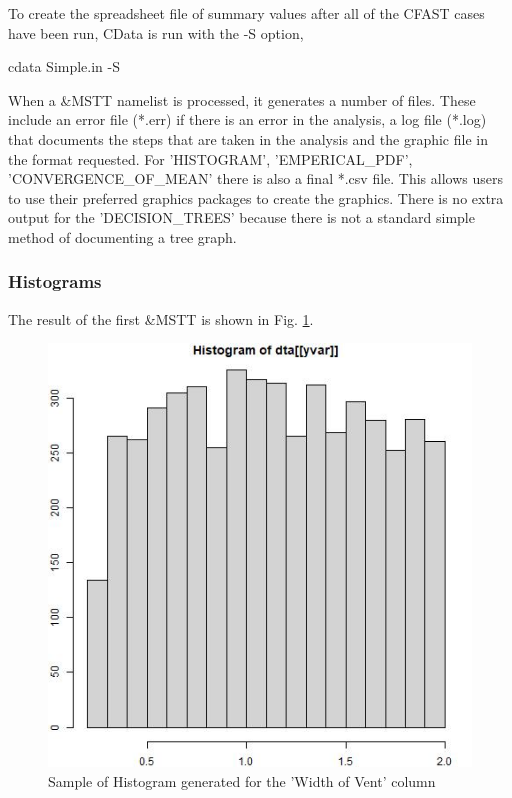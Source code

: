 \documentclass[12pt,twoside]{book}
\begin{document}
To create the spreadsheet file of summary values after all of the CFAST cases have been run, CData is run with the {\ct -S} option,

\vspace{\baselineskip}
{\ct cdata Simple.in -S}
\vspace{\baselineskip}

When a {\ct \&MSTT} namelist is processed, it generates a number of files. These include an error file (*.err) if there is an error in the analysis, a log file (*.log) that documents the steps that are taken in the analysis and the graphic file in the format requested. For {\ct 'HISTOGRAM'}, {\ct 'EMPERICAL\_PDF'}, {\ct 'CONVERGENCE\_OF\_MEAN'} there is also a final *.csv file. This allows users to use their preferred graphics packages to create the graphics. There is no extra output for the {\ct 'DECISION\_TREES'} because there is not a standard simple method of documenting a tree graph.

\subsubsection{Histograms}

The result of the first {\ct \&MSTT} is shown in Fig. \ref{simple_width_hist}.

\begin{figure}[h!]
\centering
\includegraphics[width=4.5in]{FIGURES/simple_width.jpeg}
\caption{Sample of Histogram generated for the 'Width of Vent' column}
\label{simple_width_hist}
\end{figure}
\end{document}
